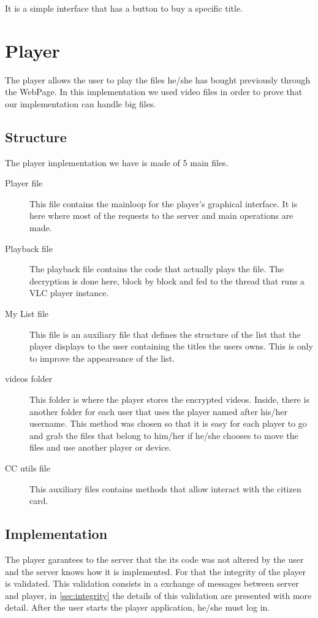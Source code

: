 \documentclass[11pt,a4paper]{report}
\begin{document}
It is a simple interface that has a button to buy a specific title.

\section{Player}
The player allows the user to play the files he/she has bought previously through the WebPage. 
\newline  In this implementation we used video files in order to prove that our implementation can handle big files.

\subsection{Structure}
The player implementation we have is made of 5 main files. 

\begin{description}
  \item[Player file] This file contains the mainloop for the player's graphical interface. It is here where most of the requests to the server and main operations are made.
  \item[Playback file] The playback file contains the code that actually plays the file. The decryption is done here, block by block and fed to the thread that runs a VLC player instance.
  \item[My List file] This file is an auxiliary file that defines the structure of the list that the player displays to the user containing the titles the users owns. This is only to improve the appeareance of the list.
  \item[videos folder] This folder is where the player stores the encrypted videos. Inside, there is another folder for each user that uses the player named after his/her username. This method was chosen so that it is easy for each player to go and grab the files that belong to him/her if he/she chooses to move the files and use another player or device.
  \item[CC utils file] This auxiliary files contains methods that allow interact with the citizen card.
\end{description}

\subsection{Implementation}

The player garantees to the server that the its code was not altered by the user and the server knows how it is implemented. For that the integrity of the player is validated. This validation consists in a exchange of messages between server and player, in \autoref{sec:integrity} the details of this validation are presented with more detail.
After the user starts the player application, he/she must log in. 
\end{document}
